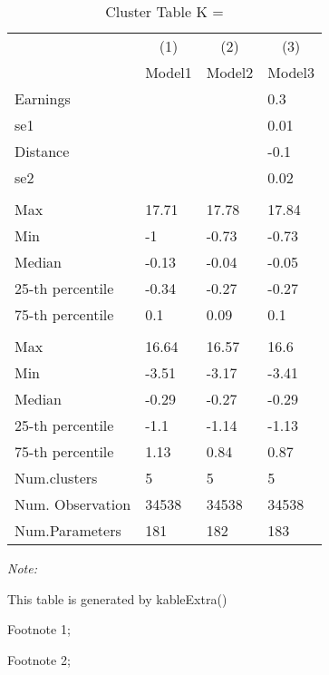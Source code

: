 \begin{table}
\centering
\caption{Cluster Table K = }
\centering
\begin{threeparttable}
\begin{tabular}[t]{llll}
\toprule
\multicolumn{1}{c}{ } & \multicolumn{1}{c}{(1)} & \multicolumn{1}{c}{(2)} & \multicolumn{1}{c}{(3)} \\
\cmidrule(l{3pt}r{3pt}){2-2} \cmidrule(l{3pt}r{3pt}){3-3} \cmidrule(l{3pt}r{3pt}){4-4}
 & Model1 & Model2 & Model3\\
\midrule
Earnings &  &  & 0.3\\
se1 &  &  & 0.01\\
Distance &  &  & -0.1\\
se2 &  &  & 0.02\\
\addlinespace[0.3em]
\multicolumn{4}{l}{\textit{\textbf{Panel A: }}}\\
\hspace{1em}Max & 17.71 & 17.78 & 17.84\\
\hspace{1em}Min & -1 & -0.73 & -0.73\\
\hspace{1em}Median & -0.13 & -0.04 & -0.05\\
\hspace{1em}25-th percentile & -0.34 & -0.27 & -0.27\\
\hspace{1em}75-th percentile & 0.1 & 0.09 & 0.1\\
\addlinespace[0.3em]
\multicolumn{4}{l}{\textit{\textbf{Panel B: }}}\\
\hspace{1em}Max & 16.64 & 16.57 & 16.6\\
\hspace{1em}Min & -3.51 & -3.17 & -3.41\\
\hspace{1em}Median & -0.29 & -0.27 & -0.29\\
\hspace{1em}25-th percentile & -1.1 & -1.14 & -1.13\\
\hspace{1em}75-th percentile & 1.13 & 0.84 & 0.87\\
Num.clusters & 5 & 5 & 5\\
Num. Observation & 34538 & 34538 & 34538\\
Num.Parameters & 181 & 182 & 183\\
\bottomrule
\end{tabular}
\begin{tablenotes}
\item \textit{Note: } 
\item This table is generated by kableExtra()
\item[1] Footnote 1; 
\item[2] Footnote 2; 
\end{tablenotes}
\end{threeparttable}
\end{table}
